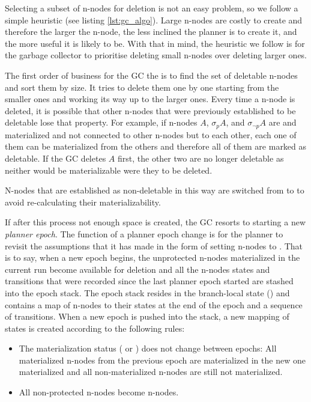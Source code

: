 Selecting a subset of n-nodes for deletion is not an easy problem, so we follow a
simple heuristic (see listing \ref{lst:gc_algo}). 
Large n-nodes are costly to create and therefore the larger the n-node,
the less inclined the planner is to create it, and the more useful it
is likely to be. With that in mind, the heuristic we follow is for the
garbage collector to prioritise deleting small n-nodes over deleting
larger ones.

The first order of business for the GC the is to find the set of
deletable n-nodes and sort them by size. It tries to delete them one by
one starting from the smaller ones and working its way up to the
larger ones. Every time a n-node is deleted, it is possible that other
n-nodes that were previously established to be deletable lose that
property. For example, if n-nodes \(A\), \(\sigma_p A\), and
\(\sigma_{\neg p} A\) are  and materialized and not
connected to other n-nodes but to each other, each one of
them can be materialized from the others and therefore all of them are
marked as deletable. If the GC deletes \(A\) first, the other
two are no longer deletable as neither would be materializable were they
to be deleted.

N-nodes that are established as non-deletable in this way are switched
from  to  to avoid re-calculating their
materializability.

If after this process not enough space is created, the GC resorts to
starting a new \emph{planner epoch}. The function of a planner epoch
change is for the planner to revisit the assumptions that it has made in
the form of setting n-nodes to . That is to say, when a new
epoch begins, the unprotected n-nodes materialized in the current run
become available for deletion and all the
n-nodes states and transitions that were recorded since the last planner
epoch started are stashed into the epoch stack. The epoch stack
resides in the branch-local state () and contains a map
of n-nodes to their states at the end of the epoch and a sequence of
transitions. When a new epoch is pushed into the stack, a new mapping
of states is created according to the following rules:

\begin{itemize}
\item The materialization status ( or ) does not change between epochs: All
  materialized n-nodes from the previous epoch are materialized in the
  new one materialized and all non-materialized n-nodes are still not
  materialized.
\item All non-protected  n-nodes become 
  n-nodes.
\end{itemize}

